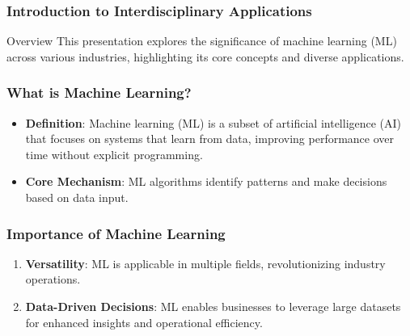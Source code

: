 \documentclass[aspectratio=169]{beamer}
\begin{document}
\frame{\titlepage}

\begin{frame}[fragile]
    \frametitle{Introduction to Interdisciplinary Applications}
    \begin{block}{Overview}
        This presentation explores the significance of machine learning (ML) across various industries, highlighting its core concepts and diverse applications.
    \end{block}
\end{frame}

\begin{frame}[fragile]
    \frametitle{What is Machine Learning?}
    \begin{itemize}
        \item \textbf{Definition}: Machine learning (ML) is a subset of artificial intelligence (AI) that focuses on systems that learn from data, improving performance over time without explicit programming.
        \item \textbf{Core Mechanism}: ML algorithms identify patterns and make decisions based on data input.
    \end{itemize}
\end{frame}

\begin{frame}[fragile]
    \frametitle{Importance of Machine Learning}
    \begin{enumerate}
        \item \textbf{Versatility}: ML is applicable in multiple fields, revolutionizing industry operations.
        \item \textbf{Data-Driven Decisions}: ML enables businesses to leverage large datasets for enhanced insights and operational efficiency.
    \end{enumerate}
\end{frame}
\end{document}
